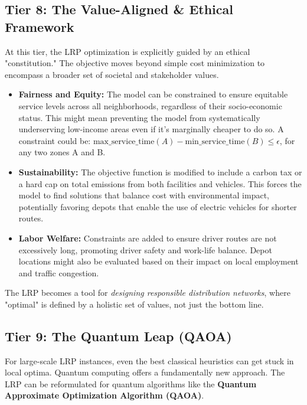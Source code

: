 \documentclass{article}
\begin{document}
\subsection{Tier 8: The Value-Aligned \& Ethical Framework}
At this tier, the LRP optimization is explicitly guided by an ethical "constitution." The objective moves beyond simple cost minimization to encompass a broader set of societal and stakeholder values.
\begin{itemize}
    \item \textbf{Fairness and Equity:} The model can be constrained to ensure equitable service levels across all neighborhoods, regardless of their socio-economic status. This might mean preventing the model from systematically underserving low-income areas even if it's marginally cheaper to do so. A constraint could be: $\text{max\_service\_time}(A) - \text{min\_service\_time}(B) \leq \epsilon$, for any two zones A and B.
    \item \textbf{Sustainability:} The objective function is modified to include a carbon tax or a hard cap on total emissions from both facilities and vehicles. This forces the model to find solutions that balance cost with environmental impact, potentially favoring depots that enable the use of electric vehicles for shorter routes.
    \item \textbf{Labor Welfare:} Constraints are added to ensure driver routes are not excessively long, promoting driver safety and work-life balance. Depot locations might also be evaluated based on their impact on local employment and traffic congestion.
\end{itemize}
The LRP becomes a tool for \textit{designing responsible distribution networks}, where "optimal" is defined by a holistic set of values, not just the bottom line.

\subsection{Tier 9: The Quantum Leap (QAOA)}
For large-scale LRP instances, even the best classical heuristics can get stuck in local optima. Quantum computing offers a fundamentally new approach. The LRP can be reformulated for quantum algorithms like the \textbf{Quantum Approximate Optimization Algorithm (QAOA)}.
\end{document}
